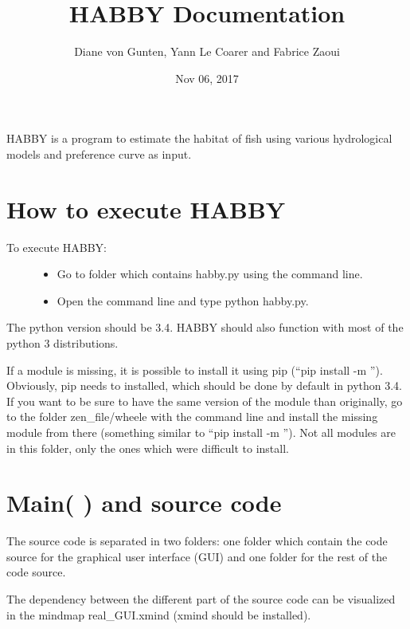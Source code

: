 \documentclass[letterpaper,10pt,english]{sphinxmanual}
\title{HABBY Documentation}
\date{Nov 06, 2017}
\author{Diane von Gunten, Yann Le Coarer and Fabrice Zaoui}
\begin{document}
\maketitle
\sphinxtableofcontents
{}\label{\detokenize{index::doc}}


HABBY is a program to estimate the habitat of fish using various hydrological models and preference curve as input.


\chapter{How to execute HABBY}
\label{\detokenize{index:how-to-execute-habby}}\label{\detokenize{index:welcome-to-habby-s-documentation}}\begin{description}
\item[{To execute HABBY:}] \leavevmode\begin{itemize}
\item {} 
Go to folder which contains habby.py using the command line.

\item {} 
Open the command line and type python habby.py.

\end{itemize}

\end{description}

The python version should be 3.4. HABBY should also function with most of the python 3 distributions.

If a module is missing, it is possible to install it using pip (``pip install -m ''). Obviously, pip needs to installed, which should be done by default in python 3.4. If you want to be sure to have the same version of the module than originally, go to the folder zen\_file/wheele with the command line and install the missing module from there (something similar to ``pip install -m ''). Not all modules are in this folder, only the ones which were difficult to install.


\chapter{Main(   ) and source code}
\label{\detokenize{index:main-and-source-code}}
The source code is separated in two folders: one folder which contain the code source for the graphical user interface (GUI) and one folder for the rest of the code source.

The dependency between the different part of the source code can be visualized in the mindmap real\_GUI.xmind (xmind should be installed).
\end{document}
